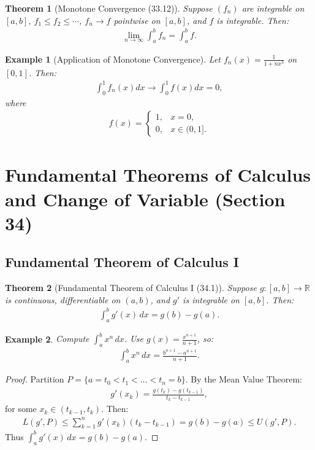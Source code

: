 \documentclass[9pt]{article}
\theoremstyle{definition}
\theoremstyle{plain}
\newtheorem{theorem}{Theorem}
\newtheorem{example}{Example}
\begin{document}
\begin{theorem}[Monotone Convergence (33.12)]
Suppose $ (f_n) $ are integrable on $ [a, b] $, $ f_1 \leq f_2 \leq \cdots $, $ f_n \to f $ pointwise on $ [a, b] $, and $ f $ is integrable. Then:
\begin{align}
\lim_{n \to \infty} \int_a^b f_n = \int_a^b f.
\end{align}
\end{theorem}

\begin{example}[Application of Monotone Convergence]
Let $ f_n(x) = \frac{1}{1 + nx^3} $ on $ [0, 1] $. Then:
\begin{align}
\int_0^1 f_n(x) dx \to \int_0^1 f(x) dx = 0,
\end{align}
where 
\begin{align}
     f(x) = \begin{cases} 1, & x = 0, \\ 0, & x \in (0, 1]. \end{cases} 
\end{align}
\end{example}
\section*{Fundamental Theorems of Calculus and Change of Variable (Section 34)}

\subsection*{Fundamental Theorem of Calculus I}
\begin{theorem}[Fundamental Theorem of Calculus I (34.1)]
Suppose $ g : [a, b] \to \mathbb{R} $ is continuous, differentiable on $ (a, b) $, and $ g' $ is integrable on $ [a, b] $. Then:
\begin{align}
\int_a^b g'(x) \, dx = g(b) - g(a).
\end{align}
\end{theorem}

\begin{example}
Compute $ \int_a^b x^n \, dx $. Use $ g(x) = \frac{x^{n+1}}{n+1} $, so:
\begin{align}
\int_a^b x^n \, dx = \frac{b^{n+1} - a^{n+1}}{n+1}.
\end{align}
\end{example}

\begin{proof}
Partition $ P = \{a = t_0 < t_1 < \ldots < t_n = b\} $. By the Mean Value Theorem:
\begin{align}
g'(x_k) = \frac{g(t_k) - g(t_{k-1})}{t_k - t_{k-1}},
\end{align}
for some $ x_k \in (t_{k-1}, t_k) $. Then:
\begin{align}
L(g', P) \leq \sum_{k=1}^n g'(x_k)(t_k - t_{k-1}) = g(b) - g(a) \leq U(g', P).
\end{align}
Thus $ \int_a^b g'(x) \, dx = g(b) - g(a) $.
\end{proof}
\end{document}
